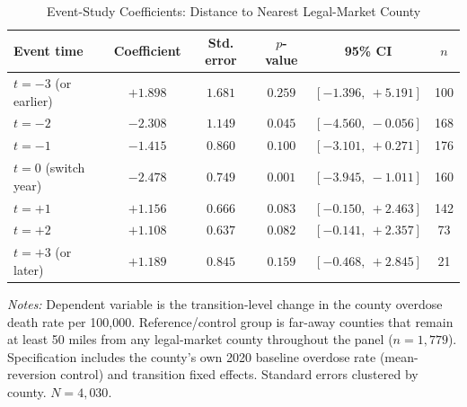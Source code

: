 \begin{table}[htbp]
\centering
\caption{Event-Study Coefficients: Distance to Nearest Legal-Market County}
\label{tab:eventstudy_main}
\begin{tabular}{lccccc}
\toprule
Event time & Coefficient & Std. error & $p$-value & 95\% CI & $n$ \\
\midrule
$t=-3$ (or earlier)  & $+1.898$  & $1.681$ & $0.259$ & $[-1.396,\ +5.191]$ & 100 \\
$t=-2$               & $-2.308$  & $1.149$ & $0.045$ & $[-4.560,\ -0.056]$ & 168 \\
$t=-1$               & $-1.415$  & $0.860$ & $0.100$ & $[-3.101,\ +0.271]$ & 176 \\
$t=0$ (switch year)  & $-2.478$  & $0.749$ & $0.001$ & $[-3.945,\ -1.011]$ & 160 \\
$t=+1$               & $+1.156$  & $0.666$ & $0.083$ & $[-0.150,\ +2.463]$ & 142 \\
$t=+2$               & $+1.108$  & $0.637$ & $0.082$ & $[-0.141,\ +2.357]$ & 73 \\
$t=+3$ (or later)    & $+1.189$  & $0.845$ & $0.159$ & $[-0.468,\ +2.845]$ & 21 \\
\bottomrule
\end{tabular}
\begin{minipage}{0.95\textwidth}
\vspace{0.3em}
\footnotesize
\textit{Notes:} Dependent variable is the transition-level change in the county overdose death rate per 100,000.
Reference/control group is far-away counties that remain at least 50 miles from any legal-market county throughout
the panel ($n=1{,}779$). Specification includes the county's own 2020 baseline overdose rate (mean-reversion control)
and transition fixed effects. Standard errors clustered by county. $N=4{,}030$.
\end{minipage}
\end{table}
